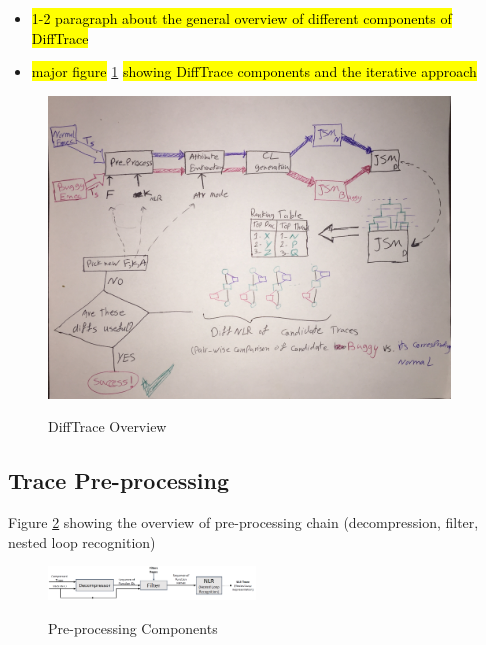 

\begin{itemize}
\item \hl{ 1-2 paragraph about the general overview of different components of DiffTrace}
\item \hl{major figure} \ref{fig.diffTraceOverview} \hl{showing DiffTrace components and the iterative approach }
\end{itemize}


\begin{figure}[]
\caption{DiffTrace Overview}
\includegraphics[width=0.95\textwidth]{figs/diffTraceOverview.jpg}
\label{fig.diffTraceOverview}
\end{figure}


\subsection{Trace Pre-processing}
Figure \ref{fig.preprocess} showing the overview of pre-processing chain (decompression, filter, nested loop recognition)


\begin{figure}[]
\caption{Pre-processing Components}
\includegraphics[width=0.49\textwidth]{figs/preprocessChain.png}
\label{fig.preprocess}
\end{figure}


